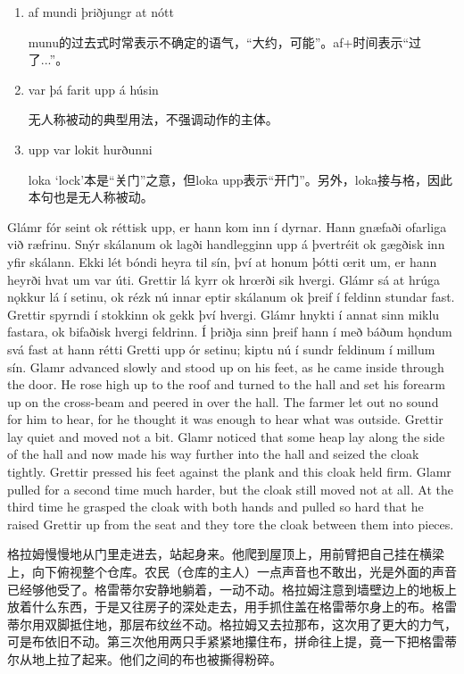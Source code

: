 \begin{grammar*}{}
    \begin{enumerate}[leftmargin=*]
        \item af mundi þriðjungr at nótt

              munu的过去式时常表示不确定的语气，“大约，可能”。af+时间表示“过了...”。

        \item var þá farit upp á húsin

              无人称被动的典型用法，不强调动作的主体。

        \item upp var lokit hurðunni

              loka `lock'本是“关门”之意，但loka upp表示“开门”。另外，loka接与格，因此本句也是无人称被动。
    \end{enumerate}
\end{grammar*}
\begin{paracol}{2}
    Glámr fór seint ok réttisk upp, er hann kom inn í dyrnar. Hann gnæfaði ofarliga við ræfrinu. Snýr skálanum ok lagði handlegginn upp á þvertréit ok gægðisk inn yfir skálann. Ekki lét bóndi heyra til sín, því at honum þótti œrit um, er hann heyrði hvat um var úti. Grettir lá kyrr ok hrœrði sik hvergi. Glámr sá at hrúga nǫkkur lá í setinu, ok rézk nú innar eptir skálanum ok þreif í feldinn stundar fast. Grettir spyrndi í stokkinn ok gekk því hvergi. Glámr hnykti í annat sinn miklu fastara, ok bifaðisk hvergi feldrinn. Í þriðja sinn þreif hann í með báðum hǫndum svá fast at hann rétti Gretti upp ór setinu; kiptu nú í sundr feldinum í millum sín.
    \switchcolumn
    Glamr advanced slowly and stood up on his feet, as he came inside through the door. He rose high up to the roof and turned to the hall and set his forearm up on the cross-beam and peered in over the hall. The farmer let out no sound for him to hear, for he thought it was enough to hear what was outside. Grettir lay quiet and moved not a bit. Glamr noticed that some heap lay along the side of the hall and now made his way further into the hall and seized the cloak tightly. Grettir pressed his feet against the plank and this cloak held firm. Glamr pulled for a second time much harder, but the cloak still moved not at all. At the third time he grasped the cloak with both hands and pulled so hard that he raised Grettir up from the seat and they tore the cloak between them into pieces.
\end{paracol}
\begin{translation*}{}
    格拉姆慢慢地从门里走进去，站起身来。他爬到屋顶上，用前臂把自己挂在横梁上，向下俯视整个仓库。农民（仓库的主人）一点声音也不敢出，光是外面的声音已经够他受了。格雷蒂尔安静地躺着，一动不动。格拉姆注意到墙壁边上的地板上放着什么东西，于是又往房子的深处走去，用手抓住盖在格雷蒂尔身上的布。格雷蒂尔用双脚抵住地，那层布纹丝不动。格拉姆又去拉那布，这次用了更大的力气，可是布依旧不动。第三次他用两只手紧紧地攥住布，拼命往上提，竟一下把格雷蒂尔从地上拉了起来。他们之间的布也被撕得粉碎。
\end{translation*}
